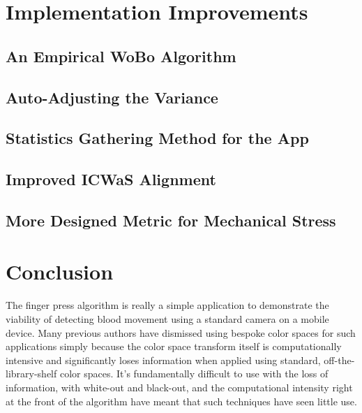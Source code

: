 \section{Implementation Improvements}\label{sec:ImplementationImprovements}

\subsection{An Empirical WoBo Algorithm}\label{sec:EmpicialWoBoAlgorithm}

\subsection{Auto-Adjusting the Variance}\label{sec:AutoAdjustingTheVariance}

\subsection{Statistics Gathering Method for the App}\label{sec:StatisticsGatheringMethod}

\subsection{Improved ICWaS Alignment}\label{sec:ImprovedICWaSAlignment}

\subsection{More Designed Metric for Mechanical Stress}\label{sec:MoreDesignedMetricforMechanicalStress}


\section{Conclusion}\label{sec:ConclusionCh5}

The finger press algorithm is really a simple application to demonstrate the viability of detecting blood movement using a standard camera on a mobile device. Many previous authors have dismissed using bespoke color spaces for such applications simply because the color space transform itself is computationally intensive and significantly loses information when applied using standard, off-the-library-shelf color spaces. It's fundamentally difficult to use with the loss of information, with white-out and black-out, and the computational intensity right at the front of the algorithm have meant that such techniques have seen little use.

